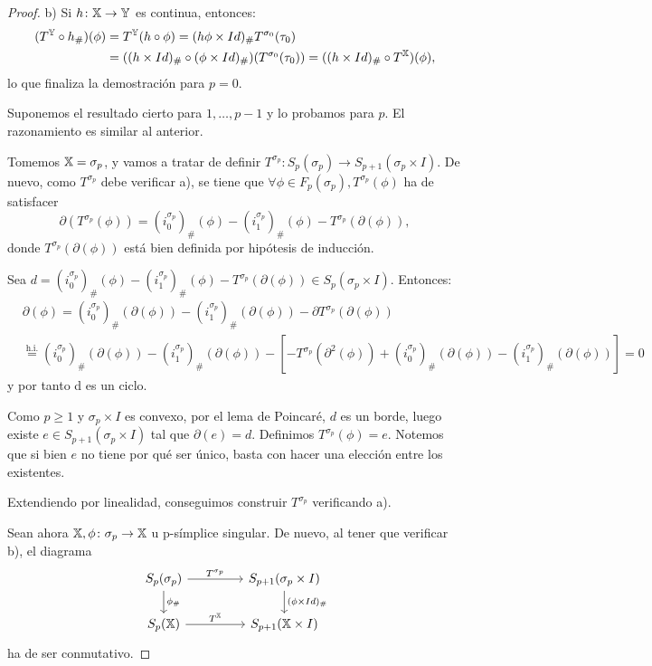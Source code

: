 \begin{proof}
  b) Si $h \colon {\mathbb X} \to {\mathbb Y}$ es continua, entonces:
  \begin{align*}
    (T^{\mathbb Y} \circ h_\#)(\phi) &= T^{\mathbb Y}(h \circ \phi) = (h\phi \times Id)_\# T^{\sigma_0}(\tau_0) \\
    &= ((h \times Id)_\# \circ (\phi \times Id)_\#) (T^{\sigma_0}(\tau_0)) = ((h \times Id)_\# \circ T^{\mathbb X})(\phi),
  \end{align*}
  lo que finaliza la demostración para $p = 0$.

  Suponemos el resultado cierto para $1, \dots, p-1$ y lo probamos para $p$. El razonamiento es similar al anterior.

  Tomemos ${\mathbb X} = \sigma_p$, y vamos a tratar de definir $T^{\sigma_p} \colon S_p(\sigma_p) \to S_{p+1}(\sigma_p \times I)$.
  De nuevo, como $T^{\sigma_p}$ debe verificar a), se tiene que $\forall \phi \in F_p(\sigma_p), T^{\sigma_p}(\phi)$ ha de satisfacer
  \[ \partial(T^{\sigma_p}(\phi)) = (i_0^{\sigma_p})_\# (\phi) - (i_1^{\sigma_p})_\# (\phi) - T^{\sigma_p}(\partial(\phi)), \]
  donde $T^{\sigma_p}(\partial(\phi))$ está bien definida por hipótesis de inducción.

  Sea $d = (i_0^{\sigma_p})_\# (\phi) - (i_1^{\sigma_p})_\# (\phi) - T^{\sigma_p}(\partial(\phi)) \in S_p(\sigma_p \times I)$.
  Entonces:
  \begin{align*}
    &\partial(\phi) = (i_0^{\sigma_p})_\# (\partial(\phi)) - (i_1^{\sigma_p})_\# (\partial(\phi)) - \partial T^{\sigma_p}(\partial(\phi)) \\
    &\stackrel{\text{h.i.}}{=} (i_0^{\sigma_p})_\#(\partial(\phi)) - (i_1^{\sigma_p})_\#(\partial(\phi)) - [ - T^{\sigma_p}(\partial^2(\phi)) +
    (i_0^{\sigma_p})_\#(\partial(\phi)) - (i_1^{\sigma_p})_\#(\partial(\phi)) ] = 0
  \end{align*}
  y por tanto d es un ciclo.

  Como $p \geq 1$ y $\sigma_p \times I$ es convexo, por el lema de Poincaré, $d$ es un borde, luego existe $e \in S_{p+1}(\sigma_p \times I)$
  tal que $\partial(e) = d$. Definimos $T^{\sigma_p}(\phi) = e$. Notemos que si bien $e$ no tiene por qué ser único, basta con hacer una elección
  entre los existentes.

  Extendiendo por linealidad, conseguimos construir $T^{\sigma_p}$ verificando a).

  Sean ahora ${\mathbb X}, \phi \colon \sigma_p \to {\mathbb X}$ u p-símplice singular. De nuevo, al tener que verificar b), el diagrama
  \[
  \begin{tikzcd}
    S_p(\sigma_p) \arrow{r}{T^{\sigma_p}} \arrow{d}{\phi_\#} & [2em] S_{p+1}(\sigma_p \times I) \arrow{d}{(\phi \times Id)_\#} \\
    \SX{p} \arrow{r}{T^\X}                 & S_{p+1}(\X \times I)
  \end{tikzcd}
  \]
  ha de ser conmutativo.


\end{proof}
